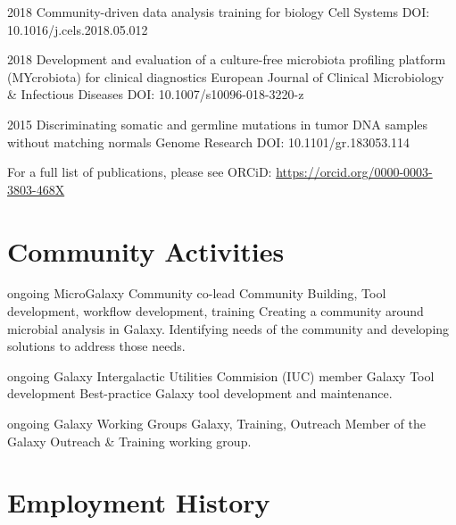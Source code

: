\documentclass[]{shiltemann-cv}
\begin{document}
\begin{entrylist}
\entry
 {2018}
 {Community-driven data analysis training for biology}
 {Cell Systems}
 {DOI: 10.1016/j.cels.2018.05.012}

\end{entrylist}
\begin{entrylist}

\entry
  {2018}
  {Development and evaluation of a culture-free microbiota profiling platform (MYcrobiota) for clinical diagnostics}
  {European Journal of Clinical Microbiology \& Infectious Diseases}
  {DOI: 10.1007/s10096-018-3220-z}


\end{entrylist}
\begin{entrylist}

\entry
  {2015}
  {Discriminating somatic and germline mutations in tumor DNA samples without matching normals }
  {Genome Research}
  {DOI: 10.1101/gr.183053.114}

\end{entrylist}

For a full list of publications, please see ORCiD: \url{https://orcid.org/0000-0003-3803-468X}

\section{Community Activities}
\begin{entrylist}
\entry
  {ongoing}
  {MicroGalaxy Community co-lead}
  {Community Building, Tool development, workflow development, training }
  {Creating a community around microbial analysis in Galaxy. Identifying needs of the community and developing solutions to address those needs.}

\end{entrylist}
\begin{entrylist}

\entry
  {ongoing}
  {Galaxy Intergalactic Utilities Commision (IUC) member}
  {Galaxy Tool development}
  {Best-practice Galaxy tool development and maintenance.}
  {}
\end{entrylist}
\begin{entrylist}

\entry
  {ongoing}
  {Galaxy Working Groups}
  {Galaxy, Training, Outreach}
  {Member of the Galaxy Outreach \& Training working group. }
  {}

\end{entrylist}

\section{Employment History}
\end{document}
